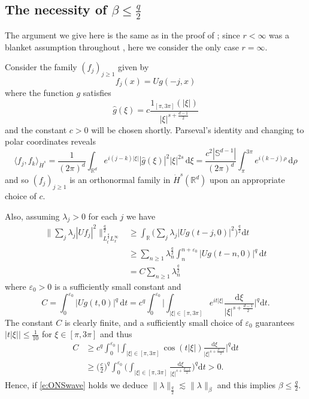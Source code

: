 \documentclass[a4paper]{amsart}
\numberwithin{equation}{section}%
\theoremstyle{plain}%
\theoremstyle{definition}
\theoremstyle{remark}%
\begin{document}
\subsection*{The necessity of $\beta \leq \frac{q}{2}$}
The argument we give here is the same as in the proof of \cite[Proposition 9]{BLN_Forum}; since $r < \infty$ was a blanket assumption throughout \cite{BLN_Forum}, here we consider the only case $r = \infty$.

Consider the family $(f_j)_{j \geq 1}$ given by 
\[
f_j(x) = Ug(-j,x)
\]
where the function $g$ satisfies
\[
\widehat{g}(\xi) = c\frac{\mathrm{1}_{[\pi,3\pi]}(|\xi|)}{|\xi|^{s + \frac{d-1}{2}}}
\]
and the constant $c > 0$ will be chosen shortly. Parseval's identity and changing to polar coordinates reveals 
\[
\langle f_j,f_k \rangle_{\dot{H}^s} = \frac{1}{(2\pi)^d}\int_{\mathbb{R}^d} e^{i(j-k)|\xi|}|\widehat{g}(\xi)|^2 |\xi|^{2s} \, \mathrm{d}\xi =  \frac{c^2|\mathbb{S}^{d-1}|}{(2\pi)^d}\int_\pi^{3\pi} e^{i(k-j)\rho} \, \mathrm{d}\rho
\]
and so $(f_j)_{j \geq 1}$ is an orthonormal family in $\dot{H}^s(\mathbb{R}^d)$ upon an appropriate choice of $c$.

Also, assuming $\lambda_j > 0$ for each $j$ we have
\begin{align*}
\bigg\| \sum_j \lambda_j |Uf_j|^2 \bigg\|_{L^{\frac{q}{2}}_tL^\infty_x}^{\frac{q}{2}} & \geq \int_{\mathbb{R}} \bigg( \sum_j \lambda_j |Ug(t-j,0)|^2 \bigg)^{\frac{q}{2}} \mathrm{d}t \\
& \geq \sum_{n \geq 1} \lambda_n^{\frac{q}{2}} \int_n^{n+\varepsilon_0}   |Ug(t-n,0)|^q \, \mathrm{d}t \\
& = C \sum_{n \geq 1} \lambda_n^{\frac{q}{2}} 
\end{align*}
where $\varepsilon_0 > 0$ is a sufficiently small constant and
\[
C = \int_0^{\varepsilon_0}   |Ug(t,0)|^q \, \mathrm{d}t  = c^q  \int_0^{\varepsilon_0} \bigg| \int_{|\xi| \in [\pi,3\pi]} e^{it|\xi|} \frac{\mathrm{d}\xi}{|\xi|^{s + \frac{d-1}{2}}} \bigg|^q \mathrm{d}t.
\]
The constant $C$ is clearly finite, and a sufficiently small choice of $\varepsilon_0$ guarantees $|t|\xi|| \leq \frac{1}{10}$ for $\xi \in [\pi,3\pi]$ and thus
\begin{align*}
C & \geq c^q  \int_0^{\varepsilon_0} \bigg| \int_{|\xi| \in [\pi,3\pi]} \cos(t|\xi|) \frac{\mathrm{d}\xi}{|\xi|^{s + \frac{d-1}{2}}} \bigg|^q \mathrm{d}t \\
& \geq  \bigg(\frac{c}{2} \bigg)^q \int_0^{\varepsilon_0} \bigg(\int_{|\xi| \in [\pi,3\pi]}  \frac{\mathrm{d}\xi}{|\xi|^{s + \frac{d-1}{2}}} \bigg)^q \mathrm{d}t
> 0.
\end{align*}
Hence, if \eqref{e:ONSwave} holds we deduce $\|\lambda\|_{\frac{q}{2}} \lesssim \|\lambda\|_{\beta}$ and this implies $\beta \leq \frac{q}{2}$.
\end{document}
